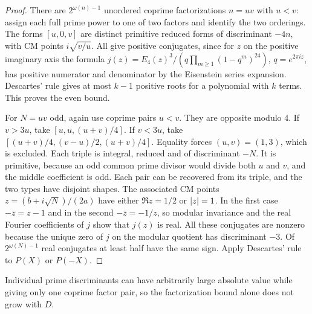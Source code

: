 \begin{proof}
There are $2^{\omega(n)-1}$ unordered coprime factorizations $n=uv$ with $u<v$: assign each
full prime power to one of two factors and identify the two orderings. The forms
$[u,0,v]$ are distinct primitive reduced forms of discriminant $-4n$, with CM points
$i\sqrt{v/u}$. All give positive conjugates, since for $z$ on the positive imaginary axis
the formula $j(z)=E_4(z)^3/(q\prod_{m\ge1}(1-q^m)^{24})$, $q=e^{2\pi iz}$, has positive
numerator and denominator by the Eisenstein series expansion. Descartes' rule gives at
most $k-1$ positive roots for a polynomial with $k$ terms. This proves the even bound.

For $N=uv$ odd, again use coprime pairs $u<v$. They are opposite modulo $4$. If $v>3u$,
take $[u,u,(u+v)/4]$. If $v<3u$, take $[(u+v)/4,(v-u)/2,(u+v)/4]$. Equality forces
$(u,v)=(1,3)$, which is excluded. Each triple is integral, reduced and of discriminant
$-N$. It is primitive, because an odd common prime divisor would divide both $u$ and $v$,
and the middle coefficient is odd. Each pair can be recovered from its triple, and the two
types have disjoint shapes. The associated CM points $z=(b+i\sqrt N)/(2a)$ have either
$\Re z=1/2$ or $\lvert z\rvert=1$. In the first case $-\bar z=z-1$ and in the second
$-\bar z=-1/z$, so modular invariance and the real Fourier coefficients of $j$ show that
$j(z)$ is real. All these conjugates are nonzero because the unique zero of $j$ on the
modular quotient has discriminant $-3$. Of $2^{\omega(N)-1}$ real conjugates at least half
have the same sign. Apply Descartes' rule to $P(X)$ or $P(-X)$.
\end{proof}


Individual prime discriminants can have arbitrarily large absolute value while giving only
one coprime factor pair, so the factorization bound alone does not grow with $D$.


